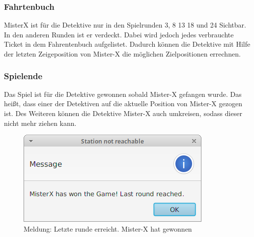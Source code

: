         \subsubsection{Fahrtenbuch}
            MisterX ist für die Detektive nur in den Spielrunden 3, 8 13 18 und 24 Sichtbar.
            In den anderen Runden ist er verdeckt.
            Dabei wird jedoch jedes verbrauchte Ticket in dem Fahrentenbuch aufgelistet.
            Dadurch können die Detektive mit Hilfe der letzten Zeigeposition von Mister-X die möglichen Zielpositionen errechnen.
        \subsubsection{Spielende}
            Das Spiel ist für die Detektive gewonnen sobald Mister-X gefangen wurde.
            Das heißt, dass einer der Detektiven auf die aktuelle Position von Mister-X gezogen ist.
            Des Weiteren können die Detektive Mister-X auch umkreisen, sodass dieser nicht mehr ziehen kann.
            \begin{figure}[H]
                \centering
                \includegraphics[scale=0.6]{img/benutzerhandbuch/won_lastround.png}   
                \caption{Meldung: Letzte runde erreicht. Mister-X hat gewonnen}
            \end{figure}

